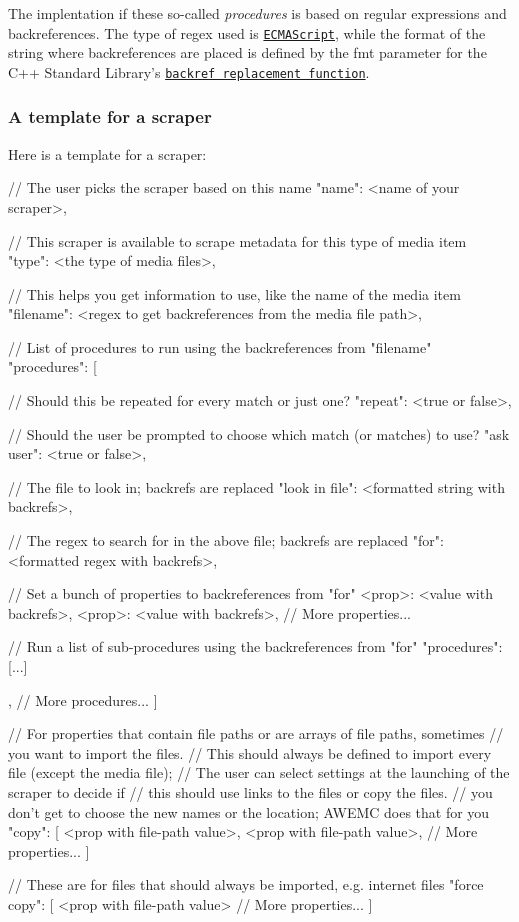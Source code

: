 The implentation if these so-\/called {\itshape procedures} is based on regular expressions and backreferences. The type of regex used is \href{http://www.cplusplus.com/reference/regex/ECMAScript/}{\tt E\-C\-M\-A\-Script}, while the format of the string where backreferences are placed is defined by the {\ttfamily fmt} parameter for the C++ Standard Library's \href{http://www.cplusplus.com/reference/regex/match_replace/}{\tt backref replacement function}.

\subsubsection*{A template for a scraper}

Here is a template for a scraper\-: \begin{DoxyVerb}{
    // The user picks the scraper based on this name
    "name": <name of your scraper>,

    // This scraper is available to scrape metadata for this type of media item
    "type": <the type of media files>,

    // This helps you get information to use, like the name of the media item
    "filename": <regex to get backreferences from the media file path>,

    // List of procedures to run using the backreferences from "filename"
    "procedures": [
        {
            // Should this be repeated for every match or just one?
            "repeat": <true or false>,

            // Should the user be prompted to choose which match (or matches) to use?
            "ask user": <true or false>,

            // The file to look in; backrefs are replaced
            "look in file": <formatted string with backrefs>,

            // The regex to search for in the above file; backrefs are replaced
            "for": <formatted regex with backrefs>,

            // Set a bunch of properties to backreferences from "for"
            <prop>: <value with backrefs>,
            <prop>: <value with backrefs>,
            // More properties...

            // Run a list of sub-procedures using the backreferences from "for"
            "procedures": [...]
        },
        // More procedures...
    ]

    // For properties that contain file paths or are arrays of file paths, sometimes 
    // you want to import the files.
    // This should always be defined to import every file (except the media file);
    // The user can select settings at the launching of the scraper to decide if
    // this should use links to the files or copy the files.
    // you don't get to choose the new names or the location; AWEMC does that for you
    "copy": [
        <prop with file-path value>,
        <prop with file-path value>,
        // More properties...   
    ]

    // These are for files that should always be imported, e.g. internet files
    "force copy": [
        <prop with file-path value>
        // More properties...
    ]
}
\end{DoxyVerb}



